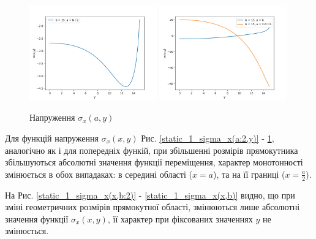 \begin{figure}[h!]
    \begin{center}
        \includegraphics[width=0.49\textwidth, scale=1]{images/results/static_1/sigma_x(a,y)1.png}
        \includegraphics[width=0.49\textwidth, scale=1]{images/results/static_1/sigma_x(a,y)2.png}
        \caption{Напруження $\sigma_x(a, y)$}\label{static_1_sigma_x(a,y)}
    \end{center}
\end{figure}

Для функцій напруження $\sigma_x(x, y)$ Рис. \ref{static_1_sigma_x(a:2,y)} - \ref{static_1_sigma_x(a,y)},
аналогічно як і для попередніх функій,
при збільшенні розмірів прямокутника збільшуються абсолютні значення функції переміщення,
характер монотонності змінюється в обох випадаках: в середині області ($x=a$), та на її границі ($x=\frac{a}{2}$).


На Рис. \ref{static_1_sigma_x(x,b:2)} - \ref{static_1_sigma_x(x,b)} видно, що при зміні геометричних розмірів прямокутної області,
змінюються лише абсолютні значення функції $\sigma_x(x, y)$, її характер при фіксованих значеннях $y$ не змінюється.

